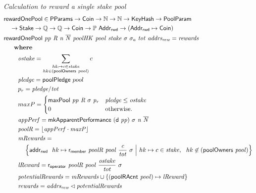 \begin{figure}[htb]
  \emph{Calculation to reward a single stake pool}
  \begin{align*}
    & \mathsf{rewardOnePool} \in \mathsf{PParams} \to \mathsf{Coin} \to \mathbb{N} \to \mathbb{N} \to \mathsf{KeyHash} \to \mathsf{PoolParam}\\
      & ~~~\to \mathsf{Stake} \to \mathbb{Q} \to \mathbb{Q} \to \mathsf{Coin} \to \mathbb{P}~\mathsf{Addr_{rwd}}
           \to (\mathsf{Addr_{rwd}} \mapsto \mathsf{Coin}) \\
      & \mathsf{rewardOnePool}~\mathit{pp}~\mathit{R}~\mathit{n}~\mathit{\overline{N}}~\mathit{poolHK}~\mathit{pool}~\mathit{stake}~{\sigma}~{\sigma_a}~\mathit{tot}~\mathit{addrs_{rew}} =
          \mathit{rewards}\\
      & ~~~~ ~ \mathbf{where}~ ~  \\
      & ~~~~~~~\mathit{ostake} = \sum_{\substack{
        hk_\mapsto c\in\mathit{stake}\\
        hk\in(\mathsf{poolOwners}~\mathit{pool})\\
        }} c \\
      & ~~~~~~~\mathit{pledge} = \mathsf{poolPledge}~pool \\
      & ~~~~~~~p_{r} = \mathit{pledge} / \mathit{tot} \\
      & ~~~~~~~maxP =
      \begin{cases}
        \mathsf{maxPool}~\mathit{pp}~\mathit{R}~\sigma~\mathit{p_r}&
        \mathit{pledge} \leq \mathit{ostake}\\
        0 & \text{otherwise.}
      \end{cases} \\
      & ~~~~~~~\mathit{appPerf} = \mathsf{mkApparentPerformance}~\mathit{(\mathsf{d}~pp)}~{\sigma}~\mathit{n}~\mathit{\overline{N}} \\
      & ~~~~~~~\mathit{poolR} = \lfloor\mathit{appPerf}\cdot\mathit{maxP}\rfloor \\
      & ~~~~~~~\mathit{mRewards} = \\
      & ~~~~~~~~~~\left\{
                    \mathsf{addr_{rwd}}~ \mathit{~}hk\mapsto\mathsf{r_{member}}~ \mathit{poolR}~ \mathit{pool}~ \mathit{\frac{c}{tot}}~ {\sigma}
                    ~\Big\vert~
                    hk\mapsto c\in\mathit{stake},~~hk \not\in(\mathsf{poolOwners}~\mathit{pool})
                  \right\}\\
      & ~~~~~~~\mathit{lReward} = \mathsf{r_{operator}}~ \mathit{poolR}~ \mathit{pool}~ \mathit{\frac{\mathit{ostake}}{tot}}~ {\sigma} \\
      & ~~~~~~~\mathit{potentialRewards} =
                 \mathit{mRewards} \cup
                 \{(\mathsf{poolRAcnt}~\mathit{pool})\mapsto\mathit{lReward}\} \\
      & ~~~~~~~\mathit{rewards} = \mathit{addrs_{rew}}\lhd{\ensuremath{\mathit{potentialRewards}}} \\
  \end{align*}


\end{figure}
